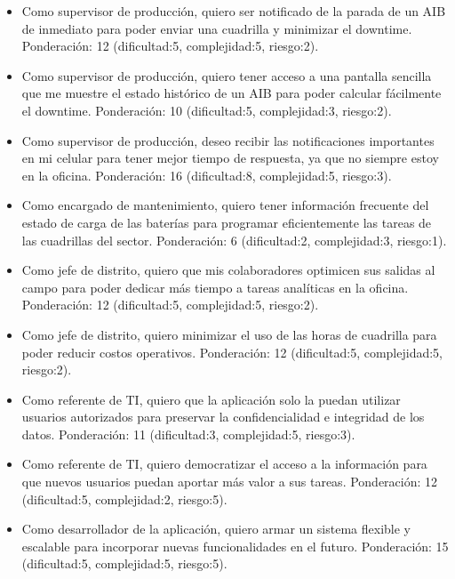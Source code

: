 \documentclass[
11pt, %
]{charter}
\begin{document}
\begin{itemize}

\item Como supervisor de producción, quiero ser notificado de la parada de un AIB de inmediato para poder enviar una cuadrilla y minimizar el downtime. Ponderación: 12 (dificultad:5, complejidad:5, riesgo:2).

\item Como supervisor de producción, quiero tener acceso a una pantalla sencilla que me muestre el estado histórico de un AIB para poder calcular fácilmente el downtime. Ponderación: 10 (dificultad:5, complejidad:3, riesgo:2).

\item Como supervisor de producción, deseo recibir las notificaciones importantes en mi celular para tener mejor tiempo de respuesta, ya que no siempre estoy en la oficina. Ponderación: 16 (dificultad:8, complejidad:5, riesgo:3).

\item Como encargado de mantenimiento, quiero tener información frecuente del estado de carga de las baterías para programar eficientemente las tareas de las cuadrillas del sector. Ponderación: 6 (dificultad:2, complejidad:3, riesgo:1).

\item Como jefe de distrito, quiero que mis colaboradores optimicen sus salidas al campo para poder dedicar más tiempo a tareas analíticas en la oficina. Ponderación: 12 (dificultad:5, complejidad:5, riesgo:2).

\item Como jefe de distrito, quiero minimizar el uso de las horas de cuadrilla para poder reducir costos operativos. Ponderación: 12 (dificultad:5, complejidad:5, riesgo:2).

\item Como referente de TI, quiero que la aplicación solo la puedan utilizar usuarios autorizados para preservar la confidencialidad e integridad de los datos. Ponderación: 11 (dificultad:3, complejidad:5, riesgo:3).

\item Como referente de TI, quiero democratizar el acceso a la información para que nuevos usuarios puedan aportar más valor a sus tareas. Ponderación: 12 (dificultad:5, complejidad:2, riesgo:5).

\item Como desarrollador de la aplicación, quiero armar un sistema flexible y escalable para incorporar nuevas funcionalidades en el futuro. Ponderación: 15 (dificultad:5, complejidad:5, riesgo:5).
\end{itemize}
\end{document}

